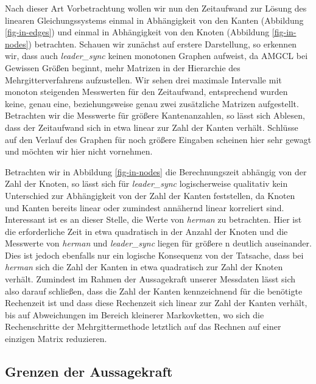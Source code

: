 \documentclass[a4paper]{article}
\theoremstyle{nonumberplain}
\begin{document}
Nach dieser Art Vorbetrachtung wollen wir nun den Zeitaufwand zur Lösung des linearen Gleichungssystems einmal in Abhängigkeit von den Kanten (Abbildung \ref{fig-in-edges}) und einmal in Abhängigkeit von den Knoten (Abbildung \ref{fig-in-nodes}) betrachten. Schauen wir zunächst auf erstere Darstellung, so erkennen wir, dass auch \textit{leader\_sync} keinen monotonen Graphen aufweist, da AMGCL bei Gewissen Größen beginnt, mehr Matrizen in der Hierarchie des Mehrgitterverfahrens aufzustellen. Wir sehen drei maximale Intervalle mit monoton steigenden Messwerten für den Zeitaufwand, entsprechend wurden keine, genau eine, beziehungsweise genau zwei zusätzliche Matrizen aufgestellt. Betrachten wir die Messwerte für größere Kantenanzahlen, so lässt sich Ablesen, dass der Zeitaufwand sich in etwa linear zur Zahl der Kanten verhält. Schlüsse auf den Verlauf des Graphen für noch größere Eingaben scheinen hier sehr gewagt und möchten wir hier nicht vornehmen.

Betrachten wir in Abbildung \ref{fig-in-nodes} die Berechnungszeit abhängig von der Zahl der Knoten, so lässt sich für \textit{leader\_sync} logischerweise qualitativ kein Unterschied zur Abhängigkeit von der Zahl der Kanten feststellen, da Knoten und Kanten bereits linear oder zumindest annähernd linear korreliert sind. Interessant ist es an dieser Stelle, die Werte von \textit{herman} zu betrachten. Hier ist die erforderliche Zeit in etwa quadratisch in der Anzahl der Knoten und die Messwerte von \textit{herman} und \textit{leader\_sync} liegen für größere \mc{}n deutlich auseinander. Dies ist jedoch ebenfalls nur ein logische Konsequenz von der Tatsache, dass bei \textit{herman} sich die Zahl der Kanten in etwa quadratisch zur Zahl der Knoten verhält.
Zumindest im Rahmen der Aussagekraft unserer Messdaten lässt sich also darauf schließen, dass die Zahl der Kanten kennzeichnend für die benötigte Rechenzeit ist und dass diese Rechenzeit sich linear zur Zahl der Kanten verhält, bis auf Abweichungen im Bereich kleinerer Markovketten, wo sich die Rechenschritte der Mehrgittermethode letztlich auf das Rechnen auf einer einzigen Matrix reduzieren.

\subsection{Grenzen der Aussagekraft}
\end{document}
